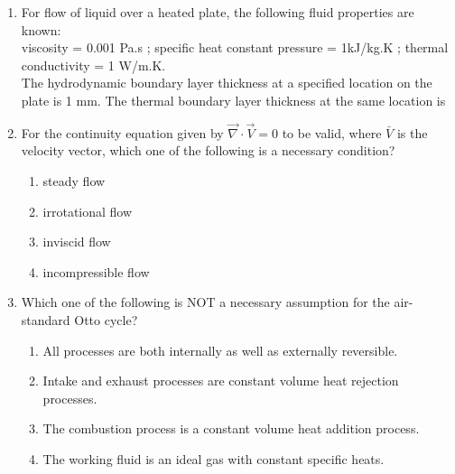 \documentclass[journal,12pt,onecolumn]{IEEEtran}
\begin{document}
\begin{enumerate}
    \item For flow of liquid over a heated plate, the following fluid properties are known:\\
          viscosity = 0.001 Pa.s ; specific heat constant pressure = 1kJ/kg.K ; thermal conductivity = 1 W/m.K.\\
          The hydrodynamic boundary layer thickness at a specified location on the plate is 1 mm. The thermal boundary layer thickness at the same location is
          \begin{enumerate}
          \end{enumerate}

    \item For the continuity equation given by $\overrightarrow{\nabla}\cdot\overrightarrow{V} = 0$ to be valid, where $\bar{V}$ is the velocity vector, which one of the following is a necessary condition?
          \begin{enumerate}
              \item steady flow
              \item irrotational flow
              \item inviscid flow
              \item incompressible flow
          \end{enumerate}

    \item Which one of the following is NOT a necessary assumption for the air-standard Otto cycle?
          \begin{enumerate}
              \item All processes are both internally as well as externally reversible.
              \item Intake and exhaust processes are constant volume heat rejection processes.
              \item The combustion process is a constant volume heat addition process.
              \item The working fluid is an ideal gas with constant specific heats.
          \end{enumerate}


\end{enumerate}
\end{document}
